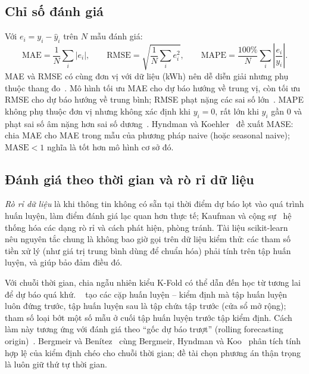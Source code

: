 \documentclass[../main.tex]{subfiles}
\begin{document}
\subsection{Chỉ số đánh giá}
Với $e_i = y_i - \hat{y}_i$ trên $N$ mẫu đánh giá:
\begin{equation}
\text{MAE} = \frac{1}{N}\sum_{i}|e_i|, \qquad
\text{RMSE} = \sqrt{\frac{1}{N}\sum_{i} e_i^2}, \qquad
\text{MAPE} = \frac{100\%}{N}\sum_{i}\left|\frac{e_i}{y_i}\right|.
\end{equation}
MAE và RMSE có cùng đơn vị với dữ liệu (kWh) nên dễ diễn giải nhưng phụ thuộc thang đo~\cite[mục 5.8]{hyndman2021fpp3}. Mô hình tối ưu MAE cho dự báo hướng về trung vị, còn tối ưu RMSE cho dự báo hướng về trung bình; RMSE phạt nặng các sai số lớn~\cite{hyndman2021fpp3}. MAPE không phụ thuộc đơn vị nhưng không xác định khi $y_i = 0$, rất lớn khi $y_i$ gần 0 và phạt sai số âm nặng hơn sai số dương~\cite{hyndman2021fpp3,hyndman2006another}. Hyndman và Koehler~\cite{hyndman2006another} đề xuất MASE: chia MAE cho MAE trong mẫu của phương pháp naive (hoặc seasonal naive); $\text{MASE} < 1$ nghĩa là tốt hơn mô hình cơ sở đó.

\subsection{Đánh giá theo thời gian và rò rỉ dữ liệu}
\textit{Rò rỉ dữ liệu} là khi thông tin không có sẵn tại thời điểm dự báo lọt vào quá trình huấn luyện, làm điểm đánh giá lạc quan hơn thực tế; Kaufman và cộng sự~\cite{kaufman2012leakage} hệ thống hóa các dạng rò rỉ và cách phát hiện, phòng tránh. Tài liệu scikit-learn~\cite{sklearn2026pitfalls} nêu nguyên tắc chung là không bao giờ gọi  trên dữ liệu kiểm thử: các tham số tiền xử lý (như giá trị trung bình dùng để chuẩn hóa) phải tính trên tập huấn luyện, và  giúp bảo đảm điều đó.

Với chuỗi thời gian, chia ngẫu nhiên kiểu K-Fold có thể dẫn đến học từ tương lai để dự báo quá khứ. ~\cite{sklearn2026tss} tạo các cặp huấn luyện -- kiểm định mà tập huấn luyện luôn đứng trước, tập huấn luyện sau là tập chứa tập trước (cửa sổ mở rộng); tham số  loại bớt một số mẫu ở cuối tập huấn luyện trước tập kiểm định. Cách làm này tương ứng với đánh giá theo ``gốc dự báo trượt'' (rolling forecasting origin)~\cite[mục 5.10]{hyndman2021fpp3}. Bergmeir và Benítez~\cite{bergmeir2012use} cùng Bergmeir, Hyndman và Koo~\cite{bergmeir2018note} phân tích tính hợp lệ của kiểm định chéo cho chuỗi thời gian; đề tài chọn phương án thận trọng là luôn giữ thứ tự thời gian.
\end{document}
